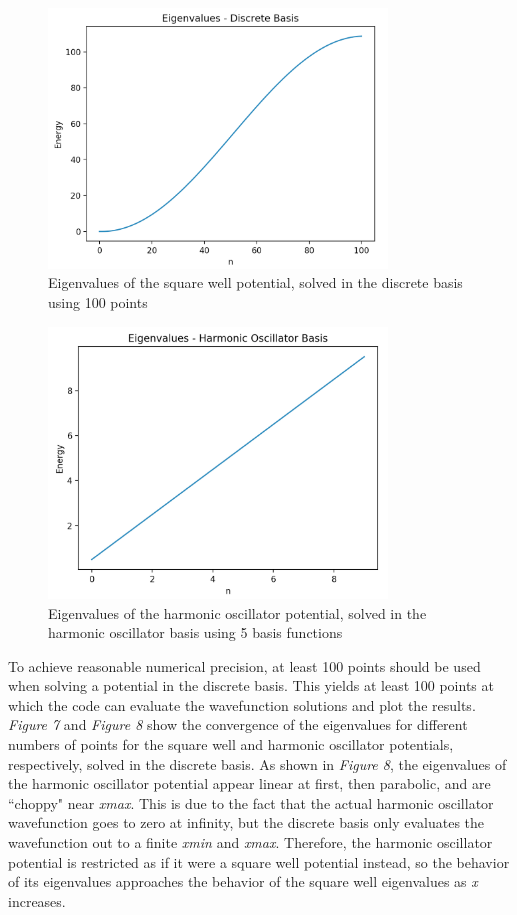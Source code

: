 \documentclass[%
 reprint,
 amsmath,amssymb,
 aps,
]{revtex4-1}
\begin{document}
\begin{figure}
\includegraphics[width=9cm]{DiscreteSquareWellEigenvalues}
\caption{Eigenvalues of the square well potential, solved in the discrete basis using 100 points}
\end{figure}
\begin{figure}
\includegraphics[width=9cm]{HOHarmonicOscillatorEigenvalues}
\caption{Eigenvalues of the harmonic oscillator potential, solved in the harmonic oscillator basis using 5 basis functions}
\end{figure}

\noindent To achieve reasonable numerical precision, at least 100 points should be used when solving a potential in the discrete basis.  This yields at least 100 points at which the code can evaluate the wavefunction solutions and plot the results.  \textit{Figure 7} and \textit{Figure 8} show the convergence of the eigenvalues for different numbers of points for the square well and harmonic oscillator potentials, respectively, solved in the discrete basis.  As shown in \textit{Figure 8}, the eigenvalues of the harmonic oscillator potential appear linear at first, then parabolic, and are ``choppy" near \textit{xmax}.  This is due to the fact that the actual harmonic oscillator wavefunction goes to zero at infinity, but the discrete basis only evaluates the wavefunction out to a finite \textit{xmin} and \textit{xmax}.  Therefore, the harmonic oscillator potential is restricted as if it were a square well potential instead, so the behavior of its eigenvalues approaches the behavior of the square well eigenvalues as \textit{x} increases.\\
\end{document}
